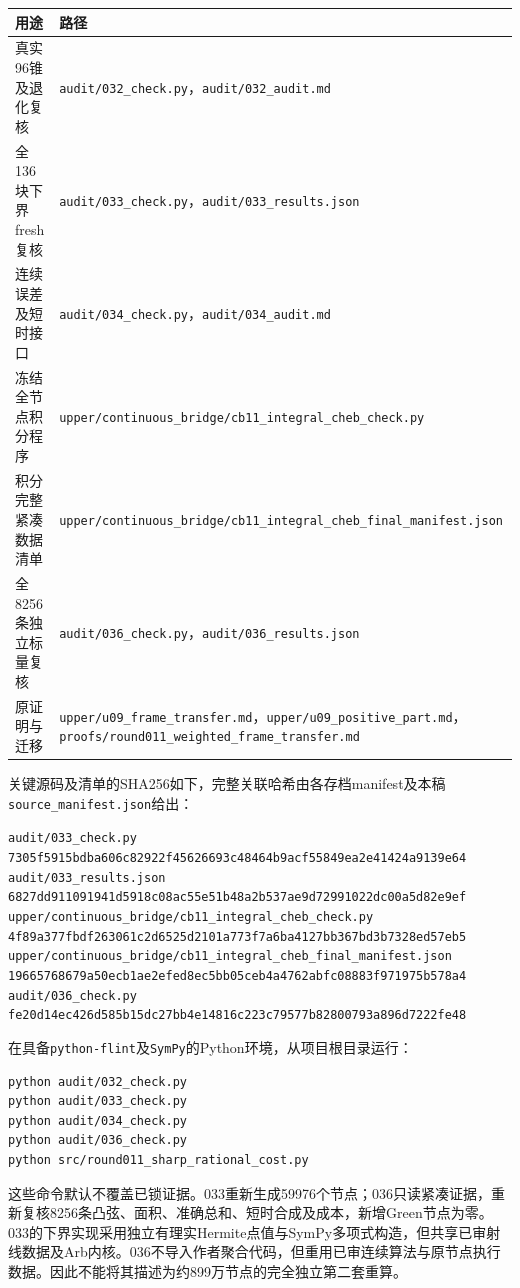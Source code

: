 \documentclass[UTF8,11pt,a4paper,fontset=fandol]{ctexart}
\theoremstyle{definition}\newtheorem{definition}[theorem]{定义}
\theoremstyle{remark}\newtheorem{remark}[theorem]{注}
\newcommand{\src}[1]{\nolinkurl{#1}}
\begin{document}
\begin{center}\small
\begin{tabular}{p{}p{}}\toprule
用途&路径\\\midrule
真实96锥及退化复核&\src{audit/032_check.py}，\src{audit/032_audit.md}\\
全136块下界fresh复核&\src{audit/033_check.py}，\src{audit/033_results.json}\\
连续误差及短时接口&\src{audit/034_check.py}，\src{audit/034_audit.md}\\
冻结全节点积分程序&\src{upper/continuous_bridge/cb11_integral_cheb_check.py}\\
积分完整紧凑数据清单&\src{upper/continuous_bridge/cb11_integral_cheb_final_manifest.json}\\
全8256条独立标量复核&\src{audit/036_check.py}，\src{audit/036_results.json}\\
原证明与迁移&\src{upper/u09_frame_transfer.md}，\src{upper/u09_positive_part.md}，\src{proofs/round011_weighted_frame_transfer.md}\\\bottomrule
\end{tabular}
\end{center}
关键源码及清单的SHA256如下，完整关联哈希由各存档manifest及本稿\src{source_manifest.json}给出：
\begin{flushleft}\footnotesize
\src{audit/033_check.py}\\
\src{7305f5915bdba606c82922f45626693c48464b9acf55849ea2e41424a9139e64}\\[1mm]
\src{audit/033_results.json}\\
\src{6827dd911091941d5918c08ac55e51b48a2b537ae9d72991022dc00a5d82e9ef}\\[1mm]
\src{upper/continuous_bridge/cb11_integral_cheb_check.py}\\
\src{4f89a377fbdf263061c2d6525d2101a773f7a6ba4127bb367bd3b7328ed57eb5}\\[1mm]
\src{upper/continuous_bridge/cb11_integral_cheb_final_manifest.json}\\
\src{19665768679a50ecb1ae2efed8ec5bb05ceb4a4762abfc08883f971975b578a4}\\[1mm]
\src{audit/036_check.py}\\
\src{fe20d14ec426d585b15dc27bb4e14816c223c79577b82800793a896d7222fe48}
\end{flushleft}

在具备\src{python-flint}及\src{SymPy}的Python环境，从项目根目录运行：
\begin{verbatim}
python audit/032_check.py
python audit/033_check.py
python audit/034_check.py
python audit/036_check.py
python src/round011_sharp_rational_cost.py
\end{verbatim}
这些命令默认不覆盖已锁证据。033重新生成59976个节点；036只读紧凑证据，重新复核8256条凸弦、面积、准确总和、短时合成及成本，新增Green节点为零。033的下界实现采用独立有理实Hermite点值与SymPy多项式构造，但共享已审射线数据及Arb内核。036不导入作者聚合代码，但重用已审连续算法与原节点执行数据。因此不能将其描述为约899万节点的完全独立第二套重算。
\end{document}
